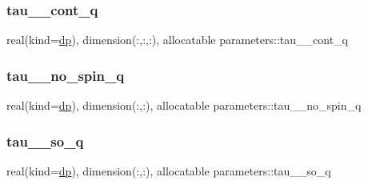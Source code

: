 \subsubsection{\texorpdfstring{tau\+\_\+\_\+cont\+\_\+q}{tau\_4\_cont\_q}}
{\footnotesize\ttfamily real(kind=\mbox{\hyperlink{namespaceparameters_a52f8c6351fd79345d8811e065bcbbb37}{dp}}), dimension(\+:,\+:,\+:), allocatable parameters\+::tau\+\_\+\_\+cont\+\_\+q}

\mbox{\label{namespaceparameters_a6722d1e0c27f2796d4e43405bd9c9d81}} 
\subsubsection{\texorpdfstring{tau\+\_\+\_\+no\+\_\+spin\+\_\+q}{tau\_4\_no\_spin\_q}}
{\footnotesize\ttfamily real(kind=\mbox{\hyperlink{namespaceparameters_a52f8c6351fd79345d8811e065bcbbb37}{dp}}), dimension(\+:,\+:), allocatable parameters\+::tau\+\_\+\_\+no\+\_\+spin\+\_\+q}

\mbox{\label{namespaceparameters_a6f95c2f318204d32f47cefa370021fe4}} 
\subsubsection{\texorpdfstring{tau\+\_\+\_\+so\+\_\+q}{tau\_4\_so\_q}}
{\footnotesize\ttfamily real(kind=\mbox{\hyperlink{namespaceparameters_a52f8c6351fd79345d8811e065bcbbb37}{dp}}), dimension(\+:,\+:), allocatable parameters\+::tau\+\_\+\_\+so\+\_\+q}


